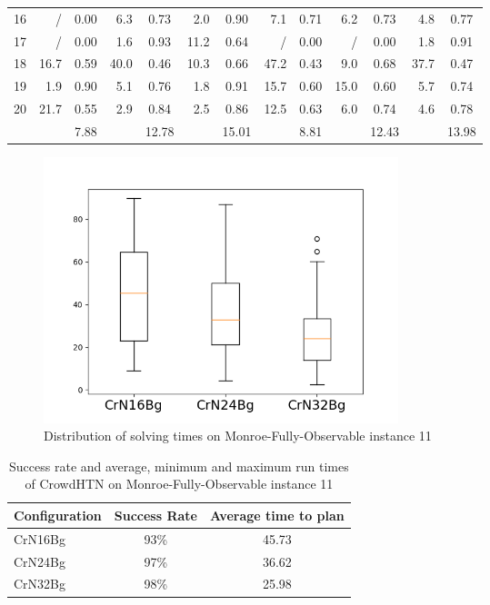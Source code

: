 \begin{table}[!hbp]
\begin{tabular}{|l|rc|rc|rc|rc|rc|rc|}
		16 & / & 0.00 & 6.3 & 0.73 & 2.0 & 0.90 & 7.1 & 0.71 & 6.2 & 0.73 & 4.8 & 0.77\\
		17 & / & 0.00 & 1.6 & 0.93 & 11.2 & 0.64 & / & 0.00 & / & 0.00 & 1.8 & 0.91\\
		18 & 16.7 & 0.59 & 40.0 & 0.46 & 10.3 & 0.66 & 47.2 & 0.43 & 9.0 & 0.68 & 37.7 & 0.47\\
		19 & 1.9 & 0.90 & 5.1 & 0.76 & 1.8 & 0.91 & 15.7 & 0.60 & 15.0 & 0.60 & 5.7 & 0.74\\
		20 & 21.7 & 0.55 & 2.9 & 0.84 & 2.5 & 0.86 & 12.5 & 0.63 & 6.0 & 0.74 & 4.6 & 0.78\\
		\hline
		& & 7.88 & & 12.78 & & 15.01 & & 8.81 & & 12.43 & & 13.98\\
		\hline
	\end{tabular}
\end{table}
\begin{figure}[!hbp]
	\caption{Distribution of solving times on Monroe-Fully-Observable instance 11}
	\label{figure: eval scalability box}
	\centering
	\includegraphics[width=0.5\textwidth]{images/final/scalability_2}
\end{figure}
\begin{table}[!hbp]
	\caption{Success rate and average, minimum and maximum run times of CrowdHTN on Monroe-Fully-Observable instance 11}
	\label{table: eval scalability 2}
	\centering
	\begin{tabular}{|l|c|c|}
		\hline
		Configuration & Success Rate & Average time to plan \\
		\hline
		CrN16Bg 	& 93\% & 45.73  \\
		CrN24Bg		& 97\% & 36.62  \\
		CrN32Bg		& 98\% & 25.98  \\
		\hline
	\end{tabular}
\end{table}

